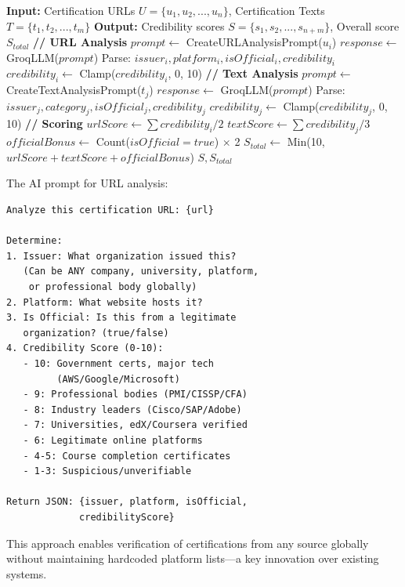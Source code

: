 \documentclass[journal]{IEEEtran}
\begin{document}
\begin{algorithm}
\caption{Dynamic Certification Credibility Scoring}
\label{alg:cert_verification}
\begin{algorithmic}[1]
\STATE \textbf{Input:} Certification URLs $U = \{u_1, u_2, ..., u_n\}$, 
\STATE \hspace{1.5cm} Certification Texts $T = \{t_1, t_2, ..., t_m\}$
\STATE \textbf{Output:} Credibility scores $S = \{s_1, s_2, ..., s_{n+m}\}$, Overall score $S_{total}$
\STATE
\STATE \textbf{// URL Analysis}
    \STATE $prompt \leftarrow$ CreateURLAnalysisPrompt($u_i$)
    \STATE $response \leftarrow$ GroqLLM($prompt$)
    \STATE Parse: $issuer_i, platform_i, isOfficial_i, credibility_i$
    \STATE $credibility_i \leftarrow$ Clamp($credibility_i$, 0, 10)
\ENDFOR
\STATE
\STATE \textbf{// Text Analysis}
    \STATE $prompt \leftarrow$ CreateTextAnalysisPrompt($t_j$)
    \STATE $response \leftarrow$ GroqLLM($prompt$)
    \STATE Parse: $issuer_j, category_j, isOfficial_j, credibility_j$
    \STATE $credibility_j \leftarrow$ Clamp($credibility_j$, 0, 10)
\ENDFOR
\STATE
\STATE \textbf{// Scoring}
\STATE $urlScore \leftarrow \sum credibility_i / 2$
\STATE $textScore \leftarrow \sum credibility_j / 3$
\STATE $officialBonus \leftarrow$ Count($isOfficial = true$) $\times$ 2
\STATE $S_{total} \leftarrow$ Min(10, $urlScore + textScore + officialBonus$)
\STATE
\RETURN $S, S_{total}$
\end{algorithmic}
\end{algorithm}

The AI prompt for URL analysis:
\begin{verbatim}
Analyze this certification URL: {url}

Determine:
1. Issuer: What organization issued this?
   (Can be ANY company, university, platform,
    or professional body globally)
2. Platform: What website hosts it?
3. Is Official: Is this from a legitimate
   organization? (true/false)
4. Credibility Score (0-10):
   - 10: Government certs, major tech
         (AWS/Google/Microsoft)
   - 9: Professional bodies (PMI/CISSP/CFA)
   - 8: Industry leaders (Cisco/SAP/Adobe)
   - 7: Universities, edX/Coursera verified
   - 6: Legitimate online platforms
   - 4-5: Course completion certificates
   - 1-3: Suspicious/unverifiable

Return JSON: {issuer, platform, isOfficial, 
             credibilityScore}
\end{verbatim}

This approach enables verification of certifications from any source globally without maintaining hardcoded platform lists—a key innovation over existing systems.
\end{document}
